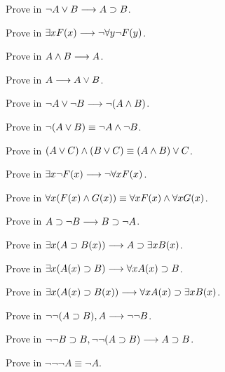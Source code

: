 \documentclass[11pt,a4paper]{article}
\begin{document}
\begin{exercise}[3.9.1]\label{exe:3.9.1}
    Prove in \LJ{:} \(\lnot A\lor B\longrightarrow A\supset B\).
\end{exercise}
\begin{exercise}[3.9.2]\label{exe:3.9.2}
    Prove in \LJ{:} \(\exists xF(x)\longrightarrow\lnot\forall y\lnot F(y)\).
\end{exercise}
\begin{exercise}[3.9.3]\label{exe:3.9.3}
    Prove in \LJ{:} \(A\land B\longrightarrow A\).
\end{exercise}
\begin{exercise}[3.9.4]\label{exe:3.9.4}
    Prove in \LJ{:} \(A\longrightarrow A\lor B\).
\end{exercise}
\begin{exercise}[3.9.5]\label{exe:3.9.5}
    Prove in \LJ{:} \(\lnot A\lor\lnot B\longrightarrow \lnot(A\land B)\).
\end{exercise}
\begin{exercise}[3.9.6]\label{exe:3.9.6}
    Prove in \LJ{:} \(\lnot(A\lor B)\equiv\lnot A\land\lnot B\).
\end{exercise}
\begin{exercise}[3.9.7]\label{exe:3.9.7}
    Prove in \LJ{:} \((A\lor C)\land(B\lor C) \equiv (A\land B)\lor C\).
\end{exercise}
\begin{exercise}[3.9.8]\label{exe:3.9.8}
    Prove in \LJ{:} \(\exists x\lnot F(x)\longrightarrow\lnot\forall xF(x)\).
\end{exercise}
\begin{exercise}[3.9.9]\label{exe:3.9.9}
    Prove in \LJ{:} \(\forall x(F(x)\land G(x))\equiv\forall xF(x)\land\forall xG(x)\).
\end{exercise}
\begin{exercise}[3.9.10]\label{exe:3.9.10}
    Prove in \LJ{:} \(A\supset\lnot B\longrightarrow B\supset\lnot A\).
\end{exercise}
\begin{exercise}[3.9.11]\label{exe:3.9.11}
    Prove in \LJ{:} \(\exists x(A\supset B(x))\longrightarrow A\supset\exists xB(x)\).
\end{exercise}
\begin{exercise}[3.9.12]\label{exe:3.9.12}
    Prove in \LJ{:} \(\exists x(A(x)\supset B)\longrightarrow\forall xA(x)\supset B\).
\end{exercise}
\begin{exercise}[3.9.13]\label{exe:3.9.13}
    Prove in \LJ{:} \(\exists x(A(x)\supset B(x))\longrightarrow\forall xA(x)\supset\exists xB(x)\).
\end{exercise}
\begin{exercise}[3.10.1]\label{exe:3.10.1}
    Prove in \LJ{:} \(\lnot\lnot(A\supset B), A\longrightarrow\lnot\lnot B\).
\end{exercise}
\begin{exercise}[3.10.2]\label{exe:3.10.2}
    Prove in \LJ{:} \(\lnot\lnot B\supset B, \lnot\lnot(A\supset B)\longrightarrow A\supset B\).
\end{exercise}
\begin{exercise}[3.10.3]\label{exe:3.10.3}
    Prove in \LJ{:} \(\lnot\lnot\lnot A\equiv\lnot A\).
\end{exercise}
\end{document}
